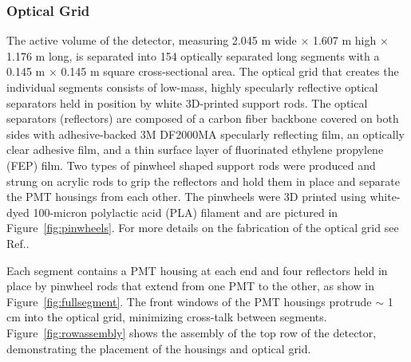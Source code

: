 \subsubsection{Optical Grid}

The active volume of the detector, measuring 2.045 m wide $\times$ 1.607 m high $\times$ 1.176 m long, is separated into 154 optically separated long segments with a 0.145 m $\times$ 0.145 m square cross-sectional area. 
The optical grid that creates the individual segments consists of low-mass, highly specularly reflective optical separators held in position by white 3D-printed support rods. 
The optical separators (reflectors) are composed of a carbon fiber backbone covered on both sides with adhesive-backed 3M DF2000MA specularly reflecting film, an optically clear adhesive film, and a thin surface layer of fluorinated ethylene propylene (FEP) film.
Two types of pinwheel shaped support rods were produced and strung on acrylic rods to grip the reflectors and hold them in place and separate the PMT housings from each other.
The pinwheels were 3D printed using white-dyed 100-micron polylactic acid (PLA) filament and are pictured in Figure~\ref{fig:pinwheels}.
For more details on the fabrication of the optical grid see Ref.\cite{Ashenfelter:2019lbf}.

Each segment contains a PMT housing at each end and four reflectors held in place by pinwheel rods that extend from one PMT to the other, as show in Figure~\ref{fig:fullsegment}.
The front windows of the PMT housings protrude $\sim$ 1 cm into the optical grid, minimizing cross-talk 
between segments. 
Figure~\ref{fig:rowassembly} shows the assembly of the top row of the detector, demonstrating the placement of the housings and optical grid. 


